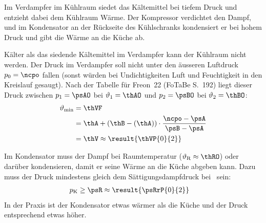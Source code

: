 Im Verdampfer im Kühlraum siedet das Kältemittel bei tiefem Druck und entzieht dabei dem Kühlraum Wärme. Der Kompressor verdichtet den Dampf, und im Kondensator an der Rückseite des Kühlschranks kondensiert er bei hohem Druck und gibt die Wärme an die Küche ab.

Kälter als das siedende Kältemittel im Verdampfer kann der Kühlraum nicht werden. Der Druck im Verdampfer soll nicht unter den äusseren Luftdruck $p_0 = \ncpo$ fallen (sonst würden bei Undichtigkeiten Luft und Feuchtigkeit in den Kreislauf gesaugt). Nach der Tabelle für Freon~22 (FoTaBe S.~192) liegt dieser Druck zwischen $p_1 = \psAO$ bei $\vartheta_1 = \thAO$ und $p_2 = \psBO$ bei $\vartheta_2 = \thBO$:
\begin{align}
 \vartheta_\text{min} &= \thVF \\
   &= \thA + \left(\thB-\left(\thA\right)\right)\cdot\frac{\ncpo-\psA}{\psB-\psA} \\
   &= \thV \approx \result{\thVP{0}{2}}
\end{align}

Im Kondensator muss der Dampf bei Raumtemperatur ($\vartheta_\text{R} \approx \thRO$) oder darüber kondensieren, damit er seine Wärme an die Küche abgeben kann. Dazu muss der Druck mindestens gleich dem Sättigungsdampfdruck bei \thRO\ sein:
\begin{align}
 p_\text{K} &\geq \psR \approx \result{\psRrP{0}{2}}
\end{align}
In der Praxis ist der Kondensator etwas wärmer als die Küche und der Druck entsprechend etwas höher.
